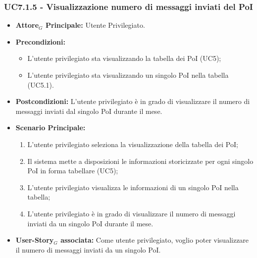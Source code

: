 \documentclass[11pt]{article}
\begin{document}
\begin{justify}
\subsubsection{\textbf{UC7.1.5 - Visualizzazione numero di messaggi inviati del PoI}}
\label{UC7.1.5}
\begin{itemize}
    \item \textbf{Attore$_G$ Principale:} Utente Privilegiato.
    \item \textbf{Precondizioni:} 
        \begin{itemize}
          \item L'utente privilegiato sta visualizzando la tabella dei PoI (UC5);
            \item L'utente privilegiato sta visualizzando un singolo PoI nella tabella (UC5.1).
        \end{itemize}
      \item \textbf{Postcondizioni:} L'utente privilegiato è in grado di visualizzare il numero di messaggi inviati dal singolo PoI durante il mese.
    \item \textbf{Scenario Principale:} 
        \begin{enumerate}
        \item L'utente privilegiato seleziona la visualizzazione della tabella dei PoI;
          \item Il sistema mette a disposizioni le informazioni storicizzate per ogni singolo PoI in forma tabellare (UC5);
          \item L'utente privilegiato visualizza le informazioni di un singolo PoI nella tabella;
            \item L'utente privilegiato è in grado di visualizzare il numero di messaggi inviati da un singolo PoI durante il mese.
        \end{enumerate}
    \item \textbf{User-Story$_G$ associata:} Come utente privilegiato, voglio poter visualizzare il numero di messaggi inviati da un singolo PoI.
\end{itemize}


\end{justify}
\end{document}

